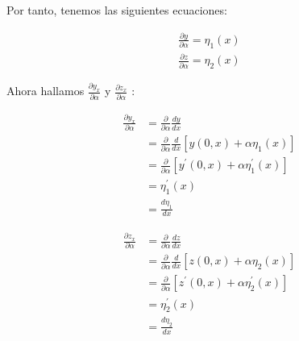 \vspace*{0.5cm}

Por tanto, tenemos las siguientes ecuaciones:

\begin{gather}
    \frac{\partial y}{\partial \alpha} = \eta_{1} (x) \\
    \frac{\partial z}{\partial \alpha} = \eta_{2} (x)
\end{gather}

\vspace*{0.5cm}

Ahora hallamos $\frac{\partial y_{x}}{\partial \alpha}$ y $\frac{\partial z_{x}}{\partial \alpha}$ :

\vspace*{0.5cm}

\begin{align*}
    \frac{\partial y_{x}}{\partial \alpha} & =  \frac{\partial}{\partial \alpha} \frac{dy}{dx} \\
                                           & = \frac{\partial}{\partial \alpha} \frac{d}{dx}
    \left[ y(0,x) + \alpha \eta_{1} (x) \right]                                                \\
                                           & = \frac{\partial}{\partial \alpha}
    \left[ y^{'} (0,x) + \alpha \eta_{1}^{'} (x) \right]                                       \\
                                           & = \eta_{1}^{'} (x)                                \\
                                           & = \frac{d \eta_{1}}{dx}
\end{align*}

\vspace*{0.5cm}

\begin{align*}
    \frac{\partial z_{x}}{\partial \alpha} & = \frac{\partial}{\partial \alpha} \frac{dz}{dx} \\
                                           & = \frac{\partial}{\partial \alpha} \frac{d}{dx}
    \left[ z(0,x) + \alpha \eta_{2} (x) \right]                                               \\
                                           & = \frac{\partial}{\partial \alpha}
    \left[ z^{'} (0,x) + \alpha \eta_{2}^{'} (x) \right]                                      \\
                                           & = \eta_{2}^{'} (x)                               \\
                                           & = \frac{d \eta_{2}}{dx}
\end{align*}

